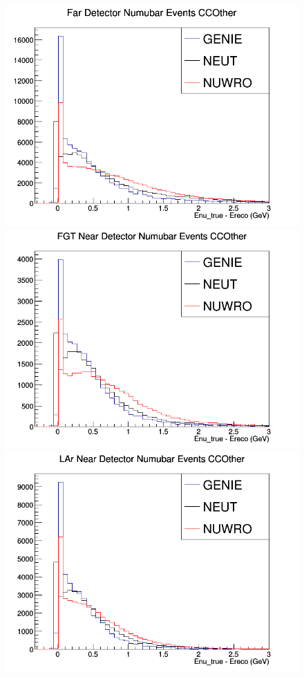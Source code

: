 \documentclass[12pt]{article}
\begin{document}
\begin{figure}[h]
\centering
{}
\includegraphics[width=\linewidth]{Ereco_Etrue/numubar_FD_CCOther.png}
\endminipage
{}
\includegraphics[width=\linewidth]{Ereco_Etrue/numubar_FGT_CCOther.png}
\endminipage
{}
\includegraphics[width=\linewidth]{Ereco_Etrue/numubar_LAr_CCOther.png}

\end{figure}
\end{document}
